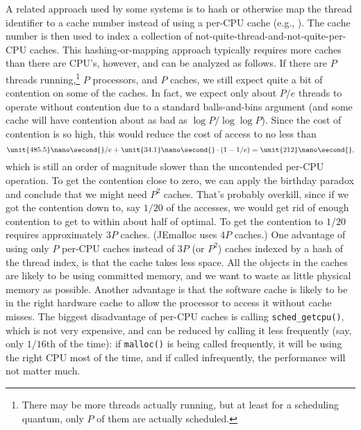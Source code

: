 \documentclass[natbib,sort&compress,10pt]{sigplanconf}
\newcommand{\code}[1]{\texttt{#1}}
\newcommand{\ns}[1]{\unit{#1}\nano\second{}}
\begin{document}
A related approach used by some systems is to hash or otherwise map
the thread identifier to a cache number instead of using a per-CPU
cache (e.g., \cite{LarsonKr98, Evans06}).  The cache number is then
used to index a collection of not-quite-thread-and-not-quite-per-CPU
caches.  This hashing-or-mapping approach typically requires more
caches than there are CPU's, however, and can be analyzed as follows.
If there are $P$ threads running,\footnote{There may be more threads
  actually running, but at least for a scheduling quantum, only $P$ of
  them are actually scheduled.} $P$ processors, and $P$ caches, we
still expect quite a bit of contention on some of the caches.  In
fact, we expect only about $P/e$ threads to operate without contention
due to a standard balls-and-bins argument (and some cache will have
contention about as bad as $\log P/\log\log P$).  Since the cost of
contention is so high, this would reduce the cost of access to no less
than
\[ \ns{485.5}/e + \ns{34.1}\cdot(1-1/e) = \ns{212},\]
which is still an order of magnitude slower than the uncontended
per-CPU operation.  To get the contention close to zero, we can apply
the birthday paradox and conclude that we might need $P^2$ caches.
That's probably overkill, since if we got the contention down to, say
$1/20$ of the accesses, we would get rid of enough contention to get
to within about half of optimal.  To get the contention to $1/20$
requires approximately $3P$ caches.  (JEmalloc uses $4P$ caches.)  One
advantage of using only $P$ per-CPU caches instead of $3P$ (or $P^2$)
caches indexed by a hash of the thread index, is that the cache takes
less space.  All the objects in the caches are likely to be using
committed memory, and we want to waste as little physical memory as
possible.  Another advantage is that the software cache is likely to
be in the right hardware cache to allow the processor to access it
without cache misses.  The biggest disadvantage of per-CPU caches is
calling \code{sched\_getcpu()}, which is not very expensive, and can
be reduced by calling it less frequently (say, only $1/16$th of the
time): if \texttt{malloc()} is being called frequently, it will be
using the right CPU most of the time, and if called infrequently, the
performance will not matter much.
\end{document}
